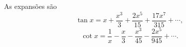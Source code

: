 As expansões são
\[
\tan x = x + \frac{x^{3}}{3} + \frac{2x^{5}}{15} + \frac{17x^{7}}{315} + \cdots,
\]
\[
\cot x = \frac{1}{x} - \frac{x}{3} - \frac{x^{3}}{45} - \frac{2x^{5}}{945} + \cdots.
\]